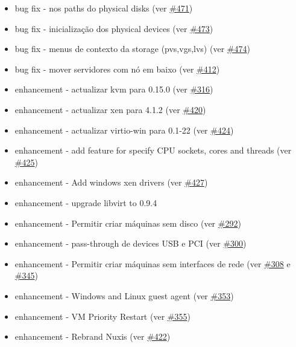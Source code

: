 \begin{itemize}
	\item bug fix - nos paths do physical disks (ver \href{https://srcmaster.eurotux.com/pm/p/etva/ticket/471}{\#471})
	\item bug fix - inicialização dos physical devices (ver \href{https://srcmaster.eurotux.com/pm/p/etva/ticket/473}{\#473})
	\item bug fix - menus de contexto da storage (pvs,vgs,lvs) (ver \href{https://srcmaster.eurotux.com/pm/p/etva/ticket/474}{\#474})
	\item bug fix - mover servidores com nó em baixo (ver \href{https://srcmaster.eurotux.com/pm/p/etva/ticket/412}{\#412})
	\item enhancement - actualizar kvm para 0.15.0 (ver \href{https://srcmaster.eurotux.com/pm/p/etva/ticket/316}{\#316})
	\item enhancement - actualizar xen para 4.1.2 (ver \href{https://srcmaster.eurotux.com/pm/p/etva/ticket/420}{\#420})
	\item enhancement - actualizar virtio-win para 0.1-22 (ver \href{https://srcmaster.eurotux.com/pm/p/etva/ticket/424}{\#424})
	\item enhancement - add feature for specify CPU sockets, cores and threads (ver \href{https://srcmaster.eurotux.com/pm/p/etva/ticket/425}{\#425})
	\item enhancement - Add windows xen drivers (ver \href{https://srcmaster.eurotux.com/pm/p/etva/ticket/427}{\#427})
	\item enhancement - upgrade libvirt to 0.9.4
	\item enhancement - Permitir criar máquinas sem disco (ver \href{https://srcmaster.eurotux.com/pm/p/etva/ticket/292}{\#292})
	\item enhancement - pass-through de devices USB e PCI (ver \href{https://srcmaster.eurotux.com/pm/p/etva/ticket/300}{\#300})
	\item enhancement - Permitir criar máquinas sem interfaces de rede (ver \href{https://srcmaster.eurotux.com/pm/p/etva/ticket/308}{\#308} e \href{https://srcmaster.eurotux.com/pm/p/etva/ticket/345}{\#345})
	\item enhancement - Windows and Linux guest agent (ver \href{https://srcmaster.eurotux.com/pm/p/etva/ticket/353}{\#353})
	\item enhancement - VM Priority Restart (ver \href{https://srcmaster.eurotux.com/pm/p/etva/ticket/355}{\#355})
	\item enhancement - Rebrand Nuxis (ver \href{https://srcmaster.eurotux.com/pm/p/etva/ticket/422}{\#422})

\end{itemize}
